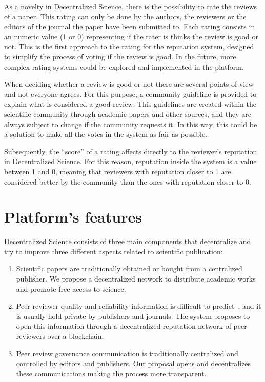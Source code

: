 \label{cha:platform-description-1}

As a novelty in Decentralized Science, there is the possibility to rate the
reviews of a paper. This rating can only be done by the authors, the reviewers
or the editors of the journal the paper have been submitted to. Each rating
consists in an numeric value (1 or 0) representing if the rater is thinks the
review is good or not. This is the first approach to the rating for the
reputation system, designed to simplify the process of voting if the review is
good. In the future, more complex rating systems could be explored and
implemented in the platform.

When deciding whether a review is good or not there are several points of
view~\cite{daniel1993guardians,cole1979fair} and not everyone agrees. For this
purpose, a community guideline is provided to explain what is considered a good
review. This guidelines are created within the scientific community through
academic papers and other sources, and they are always subject to change if the
community requests it. In this way, this could be a solution to make all the
votes in the system as fair as possible.

Subsequently, the ``score'' of a rating affects directly to the reviewer's
reputation in Decentralized Science. For this reason, reputation inside the
system is a value between 1 and 0, meaning that reviewers with reputation closer
to 1 are considered better by the community than the ones with reputation closer
to 0.


\section{Platform's features}

Decentralized Science consists of three main components that decentralize and
try to improve three different aspects related to scientific publication:
\begin{enumerate}

  
\item Scientific papers are traditionally obtained or bought from a centralized
  publisher. We propose a decentralized network to distribute academic works and
  promote free access to science.

  
\item Peer reviewer quality and reliability information is difficult to
  predict~\cite{callaham_relationship_2007}, and it is usually hold private by
  publishers and journals. The system proposes to open this information through
  a decentralized reputation network of peer reviewers over a blockchain.


\item Peer review governance communication is traditionally centralized and
  controlled by editors and publishers. Our proposal opens and decentralizes
  these communications making the process more transparent.

\end{enumerate}

